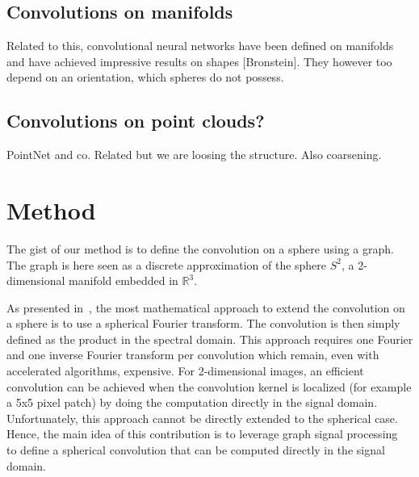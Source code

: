 \documentclass[final,twocolumn,3p,times,authoryear]{elsarticle}
\newcommand{\todo}[1]{{\color[rgb]{.6,.1,.6}{#1}}}
\newcommand{\1}{\b{1}}              %
\newcommand{\0}{\b{0}}              %
\begin{document}
\todo{Cool to have a global illustration of the network (CNN like)}

\subsection{Convolutions on manifolds}

Related to this, convolutional neural networks have been defined on manifolds and have achieved impressive results on shapes [Bronstein]. They however too depend on an orientation, which spheres do not possess.

\subsection{Convolutions on point clouds?}

PointNet and co. Related but we are loosing the structure. Also coarsening.

\section{Method}

The gist of our method is to define the convolution on a sphere using a graph.
The graph is here seen as a discrete approximation of the sphere $S^2$, a
2-dimensional manifold embedded in $\mathbb{R}^3$.

As presented in~\cite{cohen2018spherical}, the most mathematical approach to
extend the convolution on a sphere is to use a spherical Fourier transform. The
convolution is then simply defined as the product in the spectral domain. This
approach requires one Fourier and one inverse Fourier transform per convolution
which remain, even with accelerated algorithms, expensive. For 2-dimensional
images, an efficient convolution can be achieved when the convolution kernel is
localized (for example a 5x5 pixel patch) by doing the computation directly in
the signal domain. Unfortunately, this approach cannot be directly extended to
the spherical case. Hence, the main idea of this contribution is to leverage
graph signal processing~\cite{shuman2013emerging} to define a spherical
convolution that can be computed directly in the signal domain.
\end{document}
